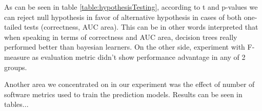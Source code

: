 As can be seen in table \ref{table:hypothesisTesting}, according to t and p-values we can reject null hypothesis in favor of alternative hypothesis in cases of both one-tailed tests (correctness, AUC area). This can be in other words interpreted that when speaking in terms of correctness and AUC area, decision trees really performed better than bayesian learners. On the other side, experiment with F-measure as evaluation metric didn't show performance advantage in any of 2 groups.

Another area we concentrated on in our experiment was the effect of number of software metrics used to train the prediction models. Results can be seen in tables...

